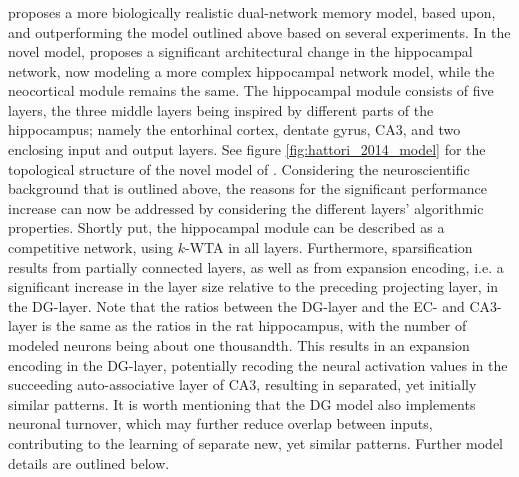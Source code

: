 \subsubsection{\cite{Hattori2014}}
\cite{Hattori2014} proposes a more biologically realistic dual-network memory model, based upon, and outperforming the model outlined above based on several experiments. In the novel model, \cite{Hattori2014} proposes a significant architectural change in the hippocampal network, now modeling a more complex hippocampal network model, while the neocortical module remains the same. The hippocampal module consists of five layers, the three middle layers being inspired by different parts of the hippocampus; namely the entorhinal cortex, dentate gyrus, CA3, and two enclosing input and output layers. See figure \ref{fig:hattori_2014_model} for the topological structure of the novel model of \cite{Hattori2014}. 
Considering the neuroscientific background that is outlined above, the reasons for the significant performance increase can now be addressed by considering the different layers' algorithmic properties. 
Shortly put, the hippocampal module can be described as a competitive network, using $k$-WTA in all layers. Furthermore, sparsification results from partially connected layers, as well as from expansion encoding, i.e. a significant increase in the layer size relative to the preceding projecting layer, in the DG-layer. Note that the ratios between the DG-layer and the EC- and CA3-layer is the same as the ratios in the rat hippocampus, with the number of modeled neurons being about one thousandth. This results in an expansion encoding in the DG-layer, potentially recoding the neural activation values in the succeeding auto-associative layer of CA3, resulting in separated, yet initially similar patterns. It is worth mentioning that the DG model also implements neuronal turnover, which may further reduce overlap between inputs, contributing to the learning of separate new, yet similar patterns. Further model details are outlined below.



